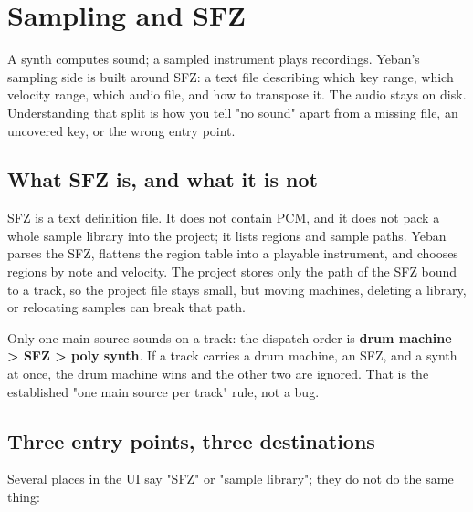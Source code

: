 \chapter{Sampling and SFZ}
\label{chap:sampling-sfz}


A synth computes sound; a sampled instrument plays recordings. Yeban's sampling side is built around SFZ: a text file describing which key range, which velocity range, which audio file, and how to transpose it. The audio stays on disk. Understanding that split is how you tell "no sound" apart from a missing file, an uncovered key, or the wrong entry point.

\section{What SFZ is, and what it is not}

SFZ is a text definition file. It does not contain PCM, and it does not pack a whole sample library into the project; it lists regions and sample paths. Yeban parses the SFZ, flattens the region table into a playable instrument, and chooses regions by note and velocity. The project stores only the path of the SFZ bound to a track, so the project file stays small, but moving machines, deleting a library, or relocating samples can break that path.

Only one main source sounds on a track: the dispatch order is \textbf{drum machine > SFZ > poly synth}. If a track carries a drum machine, an SFZ, and a synth at once, the drum machine wins and the other two are ignored. That is the established "one main source per track" rule, not a bug.

\section{Three entry points, three destinations}

Several places in the UI say "SFZ" or "sample library"; they do not do the same thing:

